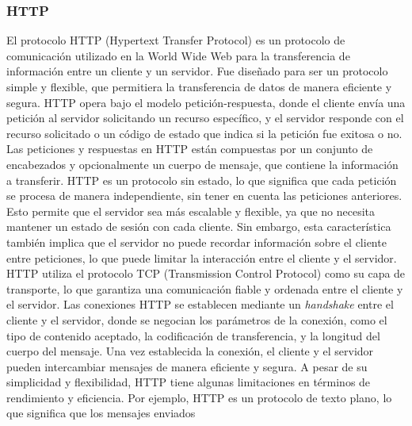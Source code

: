 \subsubsection{HTTP} %
\label{ssub:HTTP}

    El protocolo HTTP (Hypertext Transfer Protocol) es un protocolo de comunicaci\'on utilizado en 
        la World Wide Web para la transferencia de informaci\'on entre un cliente y un servidor. 
        Fue dise\~nado para ser un protocolo simple y flexible, que permitiera la transferencia 
        de datos de manera eficiente y segura. \cite{RFC2616}
    \vskip 0.5cm
        HTTP opera bajo el modelo petici\'on-respuesta, donde el cliente env\'ia una petici\'on al servidor 
            solicitando un recurso espec\'ifico, y el servidor responde con el recurso solicitado o un c\'odigo 
            de estado que indica si la petici\'on fue exitosa o no. Las peticiones y respuestas en HTTP est\'an 
            compuestas por un conjunto de encabezados y opcionalmente un cuerpo de mensaje, que contiene la 
            informaci\'on a transferir. \cite{RFC2616}
    \vskip 0.5cm
        HTTP es un protocolo sin estado, lo que significa que cada petici\'on se procesa de manera independiente, 
            sin tener en cuenta las peticiones anteriores. Esto permite que el servidor sea m\'as escalable y 
            flexible, ya que no necesita mantener un estado de sesi\'on con cada cliente. Sin embargo, esta 
            caracter\'istica tambi\'en implica que el servidor no puede recordar informaci\'on sobre el cliente 
            entre peticiones, lo que puede limitar la interacci\'on entre el cliente y el servidor. \cite{RFC2616}
    \vskip 0.5cm
        HTTP utiliza el protocolo TCP (Transmission Control Protocol) como su capa de transporte, lo que garantiza 
            una comunicaci\'on fiable y ordenada entre el cliente y el servidor. Las conexiones HTTP se establecen 
            mediante un \textit{handshake} entre el cliente y el servidor, donde se negocian los par\'ametros de la 
            conexi\'on, como el tipo de contenido aceptado, la codificaci\'on de transferencia, y la longitud del 
            cuerpo del mensaje. Una vez establecida la conexi\'on, el cliente y el servidor pueden intercambiar 
            mensajes de manera eficiente y segura. \cite{RFC2616}
    \vskip 0.5cm
        A pesar de su simplicidad y flexibilidad, HTTP tiene algunas limitaciones en t\'erminos de rendimiento y 
            eficiencia. Por ejemplo, HTTP es un protocolo de texto plano, lo que significa que los mensajes enviados 
